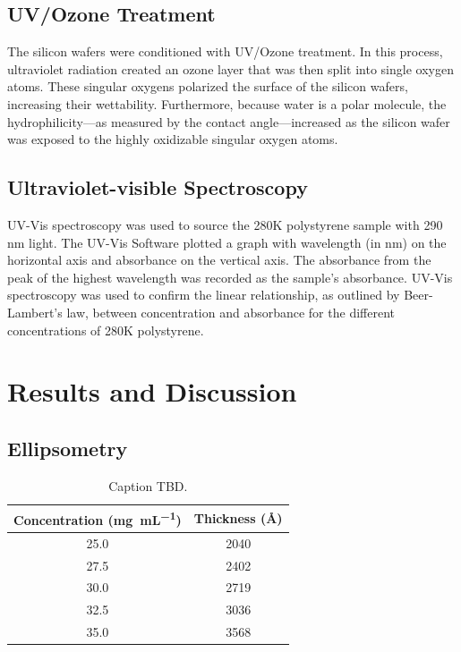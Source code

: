 \documentclass[twocolumn]{article}
\begin{document}
            \subsection{UV/Ozone Treatment}
                The silicon wafers were conditioned with UV/Ozone treatment. In this process, ultraviolet radiation created an ozone layer that was then split into single oxygen atoms. These singular oxygens polarized the surface of the silicon wafers, increasing their wettability. Furthermore, because water is a polar molecule, the hydrophilicity—as measured by the contact angle—increased as the silicon wafer was exposed to the highly oxidizable singular oxygen atoms. 

            \subsection{Ultraviolet-visible Spectroscopy}
                UV-Vis spectroscopy was used to source the 280K polystyrene sample with 290 nm light. The UV-Vis Software plotted a graph with wavelength (in nm) on the horizontal axis and absorbance on the vertical axis. The absorbance from the peak of the highest wavelength was recorded as the sample's absorbance. UV-Vis spectroscopy was used to confirm the linear relationship, as outlined by Beer-Lambert's law, between concentration and absorbance for the different concentrations of 280K polystyrene.

        \section{Results and Discussion}
            \subsection{Ellipsometry}

                \begin{table}
                    \centering
                        \begin{tabular}{@{}cc@{}}
                            \toprule
                            Concentration (\unit{\milli\gram\per\milli\liter}) & Thickness (\unit{\angstrom}) \\ \midrule
                            25.0                  & 2040          \\
                            27.5                  & 2402          \\
                            30.0                  & 2719          \\
                            32.5                  & 3036          \\
                            35.0                  & 3568          \\ \bottomrule
                        \end{tabular}
                        \caption{Caption TBD.}\label{tab:ellips}
                \end{table}
\end{document}
